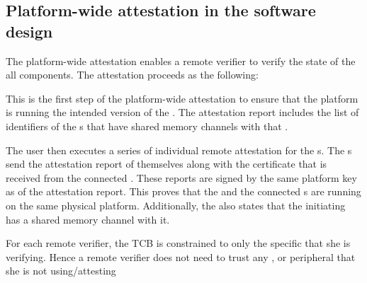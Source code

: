 \subsection{Platform-wide attestation in the software design}

The platform-wide attestation enables a remote verifier to verify the state of the all \nameenclave components. The attestation proceeds as the following:


 This is the first step of the  platform-wide attestation to ensure that the platform is running the intended version of the \app. The \app attestation report includes the list of identifiers of the \ce{}s that have shared memory channels with that \app.
    
 The user then executes a series of individual remote attestation for the \ce{}s. The \ce{}s send the attestation report of themselves along with the certificate that is received from the connected \sphw. These reports are signed by the same platform key as of the \app attestation report. This proves that the \app and the connected \ce{}s are running on the same physical platform. Additionally, the \ce also states that the initiating \app has a shared memory channel with it.

 For each remote verifier, the TCB is constrained to only the specific \nameenclave that she is verifying. Hence a remote verifier does not need to trust any \app, \ce or peripheral that she is not using/attesting


